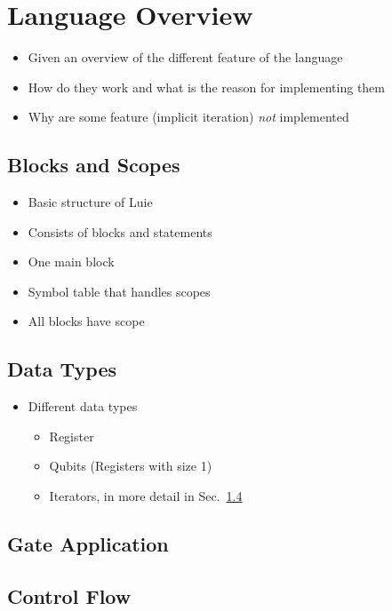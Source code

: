 \section{Language Overview}
\begin{itemize}
    \item Given an overview of the different feature of the language\
    \item How do they work and what is the reason for implementing them
    \item Why are some feature (\eg implicit iteration) \emph{not} implemented
\end{itemize}

\subsection{Blocks and Scopes}
\begin{itemize}
    \item Basic structure of Luie
    \item Consists of blocks and statements
    \item One main block
    \item Symbol table that handles scopes
    \item All blocks have scope 
\end{itemize}

\subsection{Data Types}
\begin{itemize}
    \item Different data types
    \begin{itemize}
        \item Register
        \item Qubits (Registers with size 1)
        \item Iterators, in more detail in Sec.~\ref{sec:control_flow}
    \end{itemize}
\end{itemize}


\subsection{Gate Application}

\subsection{Control Flow}
\label{sec:control_flow}

